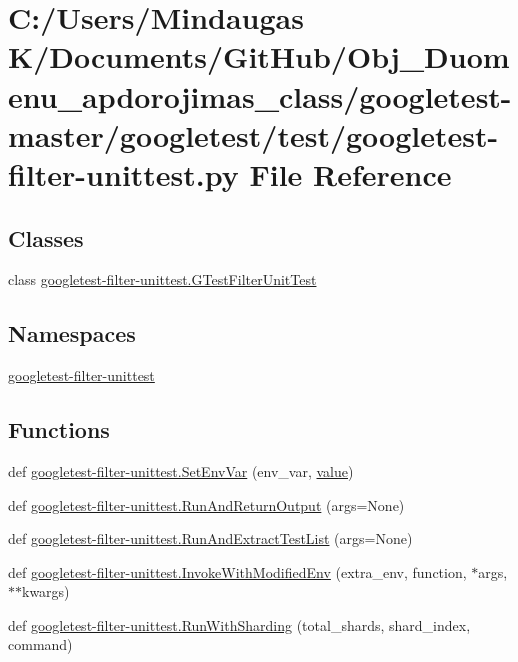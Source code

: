 \hypertarget{googletest-master_2googletest_2test_2googletest-filter-unittest_8py}{}\section{C\+:/\+Users/\+Mindaugas K/\+Documents/\+Git\+Hub/\+Obj\+\_\+\+Duomenu\+\_\+apdorojimas\+\_\+class/googletest-\/master/googletest/test/googletest-\/filter-\/unittest.py File Reference}
\label{googletest-master_2googletest_2test_2googletest-filter-unittest_8py}
\subsection*{Classes}
\begin{DoxyCompactItemize}
\item 
class \mbox{\hyperlink{classgoogletest-filter-unittest_1_1_g_test_filter_unit_test}{googletest-\/filter-\/unittest.\+G\+Test\+Filter\+Unit\+Test}}
\end{DoxyCompactItemize}
\subsection*{Namespaces}
\begin{DoxyCompactItemize}
\item 
 \mbox{\hyperlink{namespacegoogletest-filter-unittest}{googletest-\/filter-\/unittest}}
\end{DoxyCompactItemize}
\subsection*{Functions}
\begin{DoxyCompactItemize}
\item 
def \mbox{\hyperlink{namespacegoogletest-filter-unittest_a829bf5a2df452c96f0ad7a1f0d47401e}{googletest-\/filter-\/unittest.\+Set\+Env\+Var}} (env\+\_\+var, \mbox{\hyperlink{_obj__test_2lib_2googletest-master_2googlemock_2test_2gmock-matchers__test_8cc_a337b8a670efc0b086ad3af163f3121b6}{value}})
\item 
def \mbox{\hyperlink{namespacegoogletest-filter-unittest_a24bae2131f3ea9a470f76a090f704d23}{googletest-\/filter-\/unittest.\+Run\+And\+Return\+Output}} (args=None)
\item 
def \mbox{\hyperlink{namespacegoogletest-filter-unittest_a400558042f3187a396a3dfe020423dfb}{googletest-\/filter-\/unittest.\+Run\+And\+Extract\+Test\+List}} (args=None)
\item 
def \mbox{\hyperlink{namespacegoogletest-filter-unittest_aaad57c395db92d5b0cdd94a3af2359bf}{googletest-\/filter-\/unittest.\+Invoke\+With\+Modified\+Env}} (extra\+\_\+env, function, $\ast$args, $\ast$$\ast$kwargs)
\item 
def \mbox{\hyperlink{namespacegoogletest-filter-unittest_a838960aa0f3d4cce4b0f76169929b94e}{googletest-\/filter-\/unittest.\+Run\+With\+Sharding}} (total\+\_\+shards, shard\+\_\+index, command)
\end{DoxyCompactItemize}
